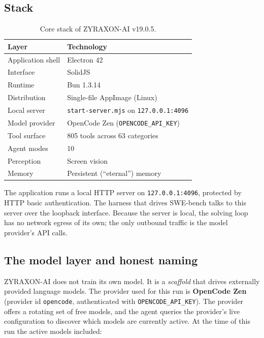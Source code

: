 \documentclass[11pt,a4paper]{article}
\begin{document}
\subsection{Stack}

\begin{table}[H]
\centering
\caption{Core stack of ZYRAXON-AI v19.0.5.}
\label{tab:stack}
\begin{tabular}{@{}ll@{}}
\toprule
Layer & Technology \\
\midrule
Application shell & Electron 42 \\
Interface & SolidJS \\
Runtime & Bun 1.3.14 \\
Distribution & Single-file AppImage (Linux) \\
Local server & \texttt{start-server.mjs} on \texttt{127.0.0.1:4096} \\
Model provider & OpenCode Zen (\texttt{OPENCODE\_API\_KEY}) \\
Tool surface & 805 tools across 63 categories \\
Agent modes & 10 \\
Perception & Screen vision \\
Memory & Persistent (``eternal'') memory \\
\bottomrule
\end{tabular}
\end{table}

The application runs a local HTTP server on \texttt{127.0.0.1:4096}, protected by HTTP
basic authentication. The harness that drives SWE-bench talks to this server over the
loopback interface. Because the server is local, the solving loop has no network egress
of its own; the only outbound traffic is the model provider's API calls.

\subsection{The model layer and honest naming}

ZYRAXON-AI does not train its own model. It is a \emph{scaffold} that drives externally
provided language models. The provider used for this run is \textbf{OpenCode Zen}
(provider id \texttt{opencode}, authenticated with \texttt{OPENCODE\_API\_KEY}). The
provider offers a rotating set of free models, and the agent queries the provider's live
configuration to discover which models are currently active. At the time of this run the
active models included:
\end{document}
